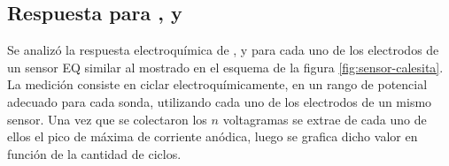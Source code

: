 {	\subsection{Respuesta para \ru, \fe\space y \fc}	

		Se analizó la respuesta electroquímica de \aminorutenio, \ferroferri\space y \ferroceno\space para cada uno de los electrodos de un sensor EQ similar al mostrado en el esquema de la figura \ref{fig:sensor-calesita}. La medición consiste en ciclar electroquímicamente, en un rango de potencial adecuado para cada sonda, utilizando cada uno de los electrodos de un mismo sensor. Una vez que se colectaron los $n$ voltagramas se extrae de cada uno de ellos el pico de máxima de corriente anódica, luego se grafica dicho valor en función de la cantidad de ciclos. 



}
